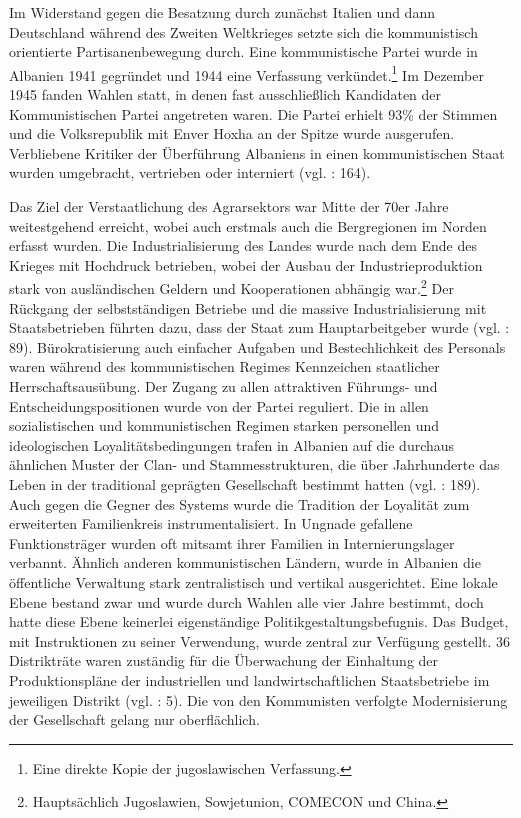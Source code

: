 Im Widerstand gegen die Besatzung durch zunächst Italien und dann Deutschland während des Zweiten Weltkrieges setzte sich die kommunistisch orientierte Partisanenbewegung durch. Eine kommunistische Partei wurde in Albanien 1941 gegründet und 1944 eine Verfassung verkündet.\footnote{Eine direkte Kopie der jugoslawischen Verfassung.} Im Dezember 1945 fanden Wahlen statt, in denen fast ausschließlich Kandidaten der Kommunistischen Partei angetreten waren. Die Partei erhielt 93\% der Stimmen und die Volksrepublik mit Enver Hoxha an der Spitze wurde ausgerufen. Verbliebene Kritiker der Überführung Albaniens in einen kommunistischen Staat wurden umgebracht, vertrieben oder interniert (vgl. \cite{vickers}: 164).\par
Das Ziel der Verstaatlichung des Agrarsektors war Mitte der 70er Jahre weitestgehend erreicht, wobei auch erstmals auch die Bergregionen im Norden erfasst wurden. Die Industrialisierung des Landes wurde nach dem Ende des Krieges mit Hochdruck betrieben, wobei der Ausbau der Industrieproduktion stark von ausländischen Geldern und Kooperationen abhängig war.\footnote{Hauptsächlich Jugoslawien, Sowjetunion, COMECON und China.} Der Rückgang der selbstständigen Betriebe und die massive Industrialisierung mit Staatsbetrieben führten dazu, dass der Staat zum Hauptarbeitgeber wurde (vgl. \cite{hens99}: 89). Bürokratisierung auch einfacher Aufgaben und Bestechlichkeit des Personals waren während des kommunistischen Regimes Kennzeichen staatlicher Herrschaftsausübung. Der Zugang zu allen attraktiven Führungs- und Entscheidungspositionen wurde von der Partei reguliert. Die in allen sozialistischen und kommunistischen Regimen starken personellen und ideologischen Loyalitätsbedingungen trafen in Albanien auf die durchaus ähnlichen Muster der Clan- und Stammesstrukturen, die über Jahrhunderte das Leben in der traditional geprägten Gesellschaft bestimmt hatten (vgl. \cite{vickers}: 189). Auch gegen die Gegner des Systems wurde die Tradition der Loyalität zum erweiterten Familienkreis instrumentalisiert. In Ungnade gefallene Funktionsträger wurden oft mitsamt ihrer Familien in Internierungslager verbannt. Ähnlich anderen kommunistischen Ländern, wurde in Albanien die öffentliche Verwaltung stark zentralistisch und vertikal ausgerichtet. Eine lokale Ebene bestand zwar und wurde durch Wahlen alle vier Jahre bestimmt, doch hatte diese Ebene keinerlei eigenständige Politikgestaltungsbefugnis. Das Budget, mit Instruktionen zu seiner Verwendung, wurde zentral zur Verfügung gestellt. 36 Distrikträte waren zuständig für die Überwachung der Einhaltung der Produktionspläne der industriellen und landwirtschaftlichen Staatsbetriebe im jeweiligen Distrikt (vgl. \cite{hoxha}: 5). Die von den Kommunisten verfolgte Modernisierung der Gesellschaft gelang nur oberflächlich.

